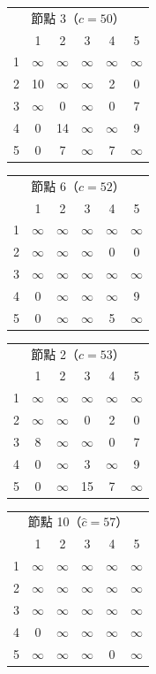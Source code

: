 \begin{center}
\footnotesize
\setlength{\tabcolsep}{3.5pt}
\begin{tabular}[t]{c|ccccc}
\multicolumn{6}{c}{節點 3（$\hat c = 50$）}\\
 & 1 & 2 & 3 & 4 & 5 \\\hline
1 & $\infty$ & $\infty$ & $\infty$ & $\infty$ & $\infty$ \\
2 & 10 & $\infty$ & $\infty$ & 2 & 0 \\
3 & $\infty$ & 0 & $\infty$ & 0 & 7 \\
4 & 0 & 14 & $\infty$ & $\infty$ & 9 \\
5 & 0 & 7 & $\infty$ & 7 & $\infty$ \\
\end{tabular}\qquad
\begin{tabular}[t]{c|ccccc}
\multicolumn{6}{c}{節點 6（$\hat c = 52$）}\\
 & 1 & 2 & 3 & 4 & 5 \\\hline
1 & $\infty$ & $\infty$ & $\infty$ & $\infty$ & $\infty$ \\
2 & $\infty$ & $\infty$ & $\infty$ & 0 & 0 \\
3 & $\infty$ & $\infty$ & $\infty$ & $\infty$ & $\infty$ \\
4 & 0 & $\infty$ & $\infty$ & $\infty$ & 9 \\
5 & 0 & $\infty$ & $\infty$ & 5 & $\infty$ \\
\end{tabular}

\medskip
\begin{tabular}[t]{c|ccccc}
\multicolumn{6}{c}{節點 2（$\hat c = 53$）}\\
 & 1 & 2 & 3 & 4 & 5 \\\hline
1 & $\infty$ & $\infty$ & $\infty$ & $\infty$ & $\infty$ \\
2 & $\infty$ & $\infty$ & 0 & 2 & 0 \\
3 & 8 & $\infty$ & $\infty$ & 0 & 7 \\
4 & 0 & $\infty$ & 3 & $\infty$ & 9 \\
5 & 0 & $\infty$ & 15 & 7 & $\infty$ \\
\end{tabular}\qquad
\begin{tabular}[t]{c|ccccc}
\multicolumn{6}{c}{節點 10（$\hat c = 57$）}\\
 & 1 & 2 & 3 & 4 & 5 \\\hline
1 & $\infty$ & $\infty$ & $\infty$ & $\infty$ & $\infty$ \\
2 & $\infty$ & $\infty$ & $\infty$ & $\infty$ & $\infty$ \\
3 & $\infty$ & $\infty$ & $\infty$ & $\infty$ & $\infty$ \\
4 & 0 & $\infty$ & $\infty$ & $\infty$ & $\infty$ \\
5 & $\infty$ & $\infty$ & $\infty$ & 0 & $\infty$ \\
\end{tabular}
\label{fig:bk-tsp-mats}
\end{center}

